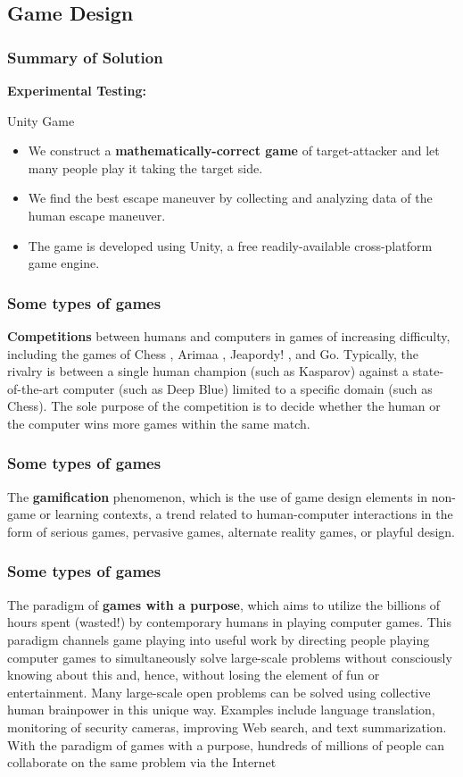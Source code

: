 \documentclass{beamer}
\begin{document}
\subsection{Game Design}
\begin{frame}
\frametitle{Summary of Solution}
\textbf{Experimental Testing:}
\begin{alertblock}{Unity Game}
	\begin{itemize}
		\item We construct a \textbf{mathematically-correct game} of target-attacker and let many people play it taking the target side. 
		\item We find the best escape maneuver by collecting and analyzing data of the human escape maneuver. 
		\item The game is developed using Unity, a free readily-available cross-platform game engine.
	\end{itemize}
\end{alertblock}
\end{frame}
\begin{frame}
\frametitle{Some types of games}
\textbf{Competitions} between humans and computers in games of increasing difficulty, including the games of Chess , Arimaa , Jeapordy! , and Go. Typically, the rivalry is between a single human champion (such as Kasparov) against a state-of-the-art computer (such as Deep Blue) limited to a specific domain (such as Chess). The sole purpose of the competition is to decide whether the human or the computer wins more games within the same match.
\end{frame}
\begin{frame}
\frametitle{Some types of games}
The \textbf{gamification} phenomenon, which is the use of game design elements in non-game or learning contexts, a trend related to human-computer interactions in the form of serious games, pervasive games, alternate reality games, or playful design.
\end{frame}
\begin{frame}
\frametitle{Some types of games}
The paradigm of \textbf{games with a purpose}, which aims to utilize the billions of hours spent (wasted!) by contemporary humans in playing computer games. This paradigm channels game playing into useful work by directing people playing computer games to simultaneously solve large-scale problems without consciously knowing about this and, hence, without losing the element of fun or entertainment. Many large-scale open problems can be solved using collective human brainpower in this unique way. Examples include language translation, monitoring of security cameras, improving Web search, and text summarization. With the paradigm of games with a purpose, hundreds of millions of people can collaborate on the same problem via the Internet
\end{frame}
\end{document}
